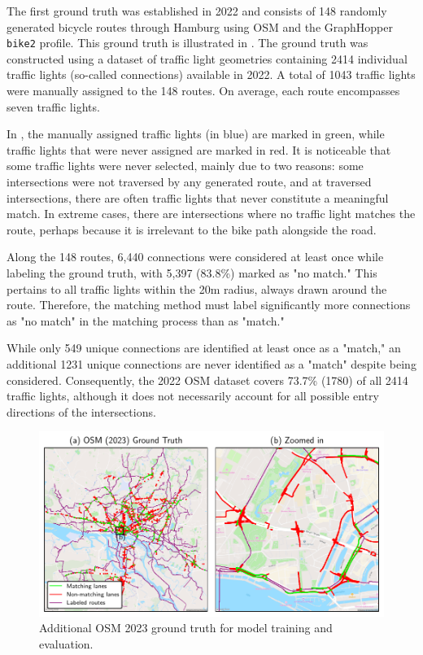 The first ground truth was established in 2022 and consists of 148 randomly generated bicycle routes through Hamburg using OSM and the GraphHopper \texttt{bike2} profile. This ground truth is illustrated in . The ground truth was constructed using a dataset of traffic light geometries containing 2414 individual traffic lights (so-called connections) available in 2022. A total of 1043 traffic lights were manually assigned to the 148 routes. On average, each route encompasses seven traffic lights.

In , the manually assigned traffic lights (in blue) are marked in green, while traffic lights that were never assigned are marked in red. It is noticeable that some traffic lights were never selected, mainly due to two reasons: some intersections were not traversed by any generated route, and at traversed intersections, there are often traffic lights that never constitute a meaningful match. In extreme cases, there are intersections where no traffic light matches the route, perhaps because it is irrelevant to the bike path alongside the road.

Along the 148 routes, 6,440 connections were considered at least once while labeling the ground truth, with 5,397 (83.8\%) marked as "no match." This pertains to all traffic lights within the 20m radius, always drawn around the route. Therefore, the matching method must label significantly more connections as "no match" in the matching process than as "match."

While only 549 unique connections are identified at least once as a "match," an additional 1231 unique connections are never identified as a "match" despite being considered. Consequently, the 2022 OSM dataset covers 73.7\% (1780) of all 2414 traffic lights, although it does not necessarily account for all possible entry directions of the intersections.

\begin{figure}[t]
\centering 
\includegraphics[width=\linewidth]{images/matching-ground-truth-osm.pdf}
\caption{Additional OSM 2023 ground truth for model training and evaluation.}
\label{fig:matching-ground-truth-osm}
\end{figure}

